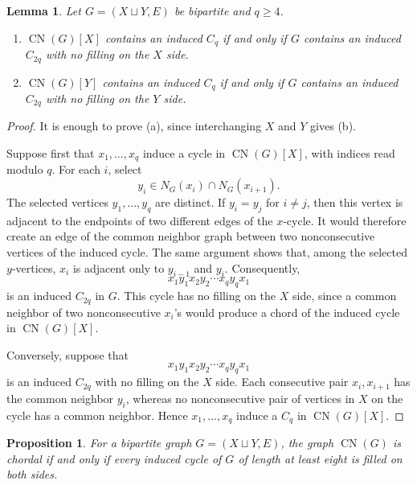 \documentclass[10pt,a4paper]{amsart}
\newtheorem{lemma}[theorem]{Lemma}
\newtheorem{proposition}[theorem]{Proposition}
\numberwithin{equation}{section}
\newcommand{\CN}{\operatorname{CN}}
\begin{document}
	\begin{lemma}\label{lem:cycle-correspondence}
		Let \(G=(X\sqcup Y,E)\) be bipartite and \(q\ge4\).
		\begin{enumerate}[label=\textup{(\alph*)}]
			\item \(\CN(G)[X]\) contains an induced \(C_q\) if and only if \(G\)
			contains an induced \(C_{2q}\) with no filling on the \(X\) side.
			\item \(\CN(G)[Y]\) contains an induced \(C_q\) if and only if \(G\)
			contains an induced \(C_{2q}\) with no filling on the \(Y\) side.
		\end{enumerate}
	\end{lemma}
	
	\begin{proof}
		It is enough to prove \textup{(a)}, since interchanging \(X\) and \(Y\)
		gives \textup{(b)}.
		
		Suppose first that \(x_1,\ldots,x_q\) induce a cycle in \(\CN(G)[X]\),
		with indices read modulo \(q\). For each \(i\), select
		\[
		y_i\in N_G(x_i)\cap N_G(x_{i+1}).
		\]
		The selected vertices \(y_1,\ldots,y_q\) are distinct. If
		\(y_i=y_j\) for \(i\ne j\), then this vertex is adjacent to the endpoints of
		two different edges of the \(x\)-cycle. It would therefore create an edge of
		the common neighbor graph between two nonconsecutive vertices of the induced
		cycle. The same argument shows that, among the selected \(y\)-vertices,
		\(x_i\) is adjacent only to \(y_{i-1}\) and \(y_i\). Consequently,
		\[
		x_1y_1x_2y_2\cdots x_qy_qx_1
		\]
		is an induced \(C_{2q}\) in \(G\). This cycle has no filling on the \(X\)
		side, since a common neighbor of two nonconsecutive \(x_i\)'s would produce a
		chord of the
		induced cycle in \(\CN(G)[X]\).
		
		Conversely, suppose that
		\[
		x_1y_1x_2y_2\cdots x_qy_qx_1
		\]
		is an induced \(C_{2q}\) with no filling on the \(X\) side. Each consecutive pair
		\(x_i,x_{i+1}\) has the common neighbor \(y_i\), whereas no nonconsecutive
		pair of vertices in \(X\) on the cycle has a common neighbor. Hence
		\(x_1,\ldots,x_q\) induce a \(C_q\) in \(\CN(G)[X]\).
	\end{proof}
	
	\begin{proposition}\label{prop:cycle-filling}
		For a bipartite graph \(G=(X\sqcup Y,E)\), the graph \(\CN(G)\) is chordal
		if and only if every induced cycle of \(G\) of length at least eight is
		filled on both sides.
	\end{proposition}
	
\end{document}
